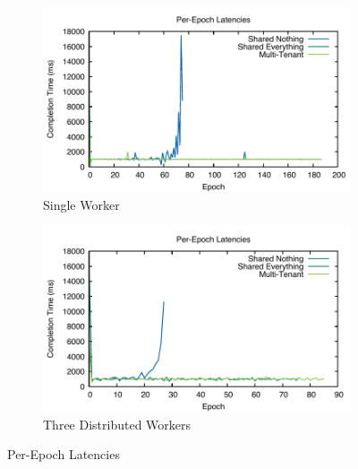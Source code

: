 \documentclass[../catalog.tex]{subfiles}
\begin{document}
\begin{figure}[h!]
  \begin{subfigure}{1.0\textwidth}
    \includegraphics[width=1.0\linewidth]{results/multitenant_w1_p1/times}
    \caption{Single Worker}
  \end{subfigure}
  \begin{subfigure}{1.0\textwidth}
    \includegraphics[width=1.0\linewidth]{results/multitenant_w1_p3/times}
    \caption{Three Distributed Workers}
  \end{subfigure}

  \caption{Per-Epoch Latencies}
\end{figure}
\end{document}
